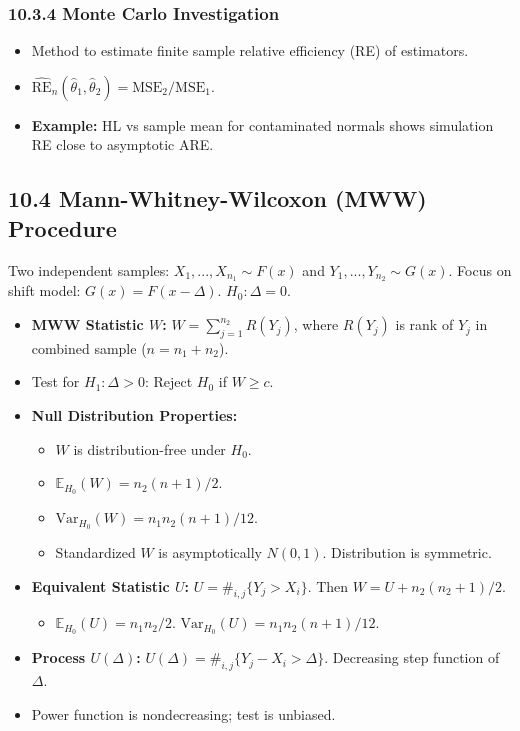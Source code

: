 \subsubsection{10.3.4 Monte Carlo Investigation}

\begin{itemize}
	\item Method to estimate finite sample relative efficiency (RE) of estimators.
	\item $\widehat{\text{RE}}_n(\widehat{\theta}_1, \widehat{\theta}_2) = \text{MSE}_2 / \text{MSE}_1$.
	\item \textbf{Example:} HL vs sample mean for contaminated normals shows simulation RE close to asymptotic ARE.
\end{itemize}

\subsection{10.4 Mann-Whitney-Wilcoxon (MWW) Procedure}

Two independent samples: $X_1, ..., X_{n_1} \sim F(x)$ and $Y_1, ..., Y_{n_2} \sim G(x)$.
Focus on shift model: $G(x) = F(x-\Delta)$. $H_0: \Delta=0$.

\begin{itemize}
	\item \textbf{MWW Statistic $W$:} $W = \sum_{j=1}^{n_2} R(Y_j)$, where $R(Y_j)$ is rank of $Y_j$ in combined sample ($n=n_1+n_2$).
	\item Test for $H_1: \Delta > 0$: Reject $H_0$ if $W \ge c$.
	\item \textbf{Null Distribution Properties:}
	\begin{itemize}
		\item $W$ is distribution-free under $H_0$.
		\item $\mathbb{E}_{H_0}(W) = n_2(n+1)/2$.
		\item $\text{Var}_{H_0}(W) = n_1 n_2 (n+1)/12$.
		\item Standardized $W$ is asymptotically $N(0,1)$. Distribution is symmetric.
	\end{itemize}
	\item \textbf{Equivalent Statistic $U$:} $U = \#_{i,j}\{Y_j > X_i\}$. Then $W = U + n_2(n_2+1)/2$.
	\begin{itemize}
		\item $\mathbb{E}_{H_0}(U) = n_1n_2/2$. $\text{Var}_{H_0}(U) = n_1n_2(n+1)/12$.
	\end{itemize}
	\item \textbf{Process $U(\Delta)$:} $U(\Delta) = \#_{i,j}\{Y_j-X_i > \Delta\}$. Decreasing step function of $\Delta$.
	\item Power function is nondecreasing; test is unbiased.
\end{itemize}

